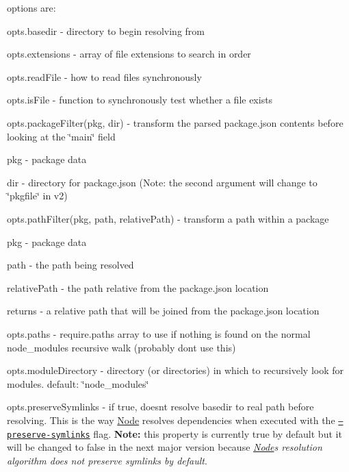 options are\+:


\begin{DoxyItemize}
\item opts.\+basedir -\/ directory to begin resolving from
\item opts.\+extensions -\/ array of file extensions to search in order
\item opts.\+read\+File -\/ how to read files synchronously
\item opts.\+is\+File -\/ function to synchronously test whether a file exists
\item {\ttfamily opts.\+package\+Filter(pkg, dir)} -\/ transform the parsed package.\+json contents before looking at the \char`\"{}main\char`\"{} field
\begin{DoxyItemize}
\item pkg -\/ package data
\item dir -\/ directory for package.\+json (Note\+: the second argument will change to \char`\"{}pkgfile\char`\"{} in v2)
\end{DoxyItemize}
\item {\ttfamily opts.\+path\+Filter(pkg, path, relative\+Path)} -\/ transform a path within a package
\begin{DoxyItemize}
\item pkg -\/ package data
\item path -\/ the path being resolved
\item relative\+Path -\/ the path relative from the package.\+json location
\item returns -\/ a relative path that will be joined from the package.\+json location
\end{DoxyItemize}
\item opts.\+paths -\/ require.\+paths array to use if nothing is found on the normal {\ttfamily node\+\_\+modules} recursive walk (probably don\textquotesingle{}t use this)
\item opts.\+module\+Directory -\/ directory (or directories) in which to recursively look for modules. default\+: {\ttfamily \char`\"{}node\+\_\+modules\char`\"{}}
\item opts.\+preserve\+Symlinks -\/ if true, doesn\textquotesingle{}t resolve {\ttfamily basedir} to real path before resolving. This is the way \mbox{\hyperlink{classNode}{Node}} resolves dependencies when executed with the \href{https://nodejs.org/api/all.html#cli_preserve_symlinks}{\tt --preserve-\/symlinks} flag. {\bfseries Note\+:} this property is currently {\ttfamily true} by default but it will be changed to {\ttfamily false} in the next major version because {\itshape \mbox{\hyperlink{classNode}{Node}}\textquotesingle{}s resolution algorithm does not preserve symlinks by default}.
\end{DoxyItemize}

